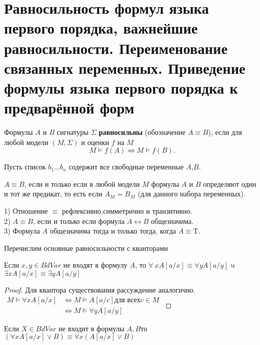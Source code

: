 \section{Равносильность формул языка первого порядка, важнейшие равносильности. Переименование связанных переменных. Приведение формулы языка первого порядка к предварённой форм}
\begin{definition}
    Формулы $A$ и $B$ сигнатуры $\Sigma$ \textbf{равносильны} (обозначение $A\equiv B$), если для любой модели $(M,\Sigma)$ и оценки $f$ на $M$
    $$M \vDash f(A) \Longleftrightarrow M \vDash f(B).$$
\end{definition}
Пусть список $b_1 \dots b_n$ содержит все свободные переменные $A$,$B$.
\begin{proposition}
    $A\equiv B$, если и только если в любой модели $M$ формулы $A$ и $B$ определяют один и тот же предикат, то есть если $A_M=B_M$ (для данного набора переменных).
\end{proposition}
\begin{proposition}
1) Отношение $\equiv$ рефлексивно,симметрично и транзитивно.\\
2) $A\equiv B$, если и только если формула $A \leftrightarrow B$ общезначима.\\
3) Формула $A$ общезначима тогда и только тогда, когда $A \equiv$\textup{T}.
\end{proposition}
Перечислим основные равносильности с кванторами
\begin{lemma}
    Если $x,y \in BdVar$ не входят в формулу $A$, то $\forall \:x A[a / x] \equiv \forall y A[a / y]$ u $\exists x A[a / x] \equiv \exists y A[a / y] $
\end{lemma}
\begin{proof}
    Для квантора существования рассуждение аналогично.\\
    $\begin{aligned}
    M \vDash \forall x A[a / x] & \Longleftrightarrow M \vDash A[a / c] \text{для всех} c \in M\\
    & \Longleftrightarrow M \vDash \forall y A[a / y]
    \end{aligned}$
\end{proof}
\begin{lemma}
    Если $X\in BdVar$ не входит в формулы $A,B$то \\
   $(\forall x A[a / x] \vee B) \equiv \forall x(A[a / x] \vee B)$
\end{lemma}
